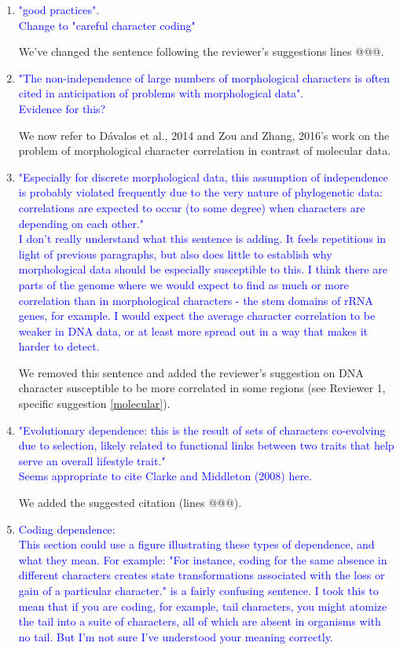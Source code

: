 \documentclass[12pt,letterpaper]{article}
\begin{document}
\begin{enumerate}
\item{\textcolor{blue}{"good practices".\\
Change to "careful character coding"}}

We've changed the sentence following the reviewer's suggestions lines @@@.

\item{\textcolor{blue}{"The non-independence of large numbers of morphological characters is often cited in anticipation of problems with morphological data".\\
Evidence for this?}}

We now refer to  D\'{a}valos et al., 2014 and Zou and Zhang, 2016's work on the problem of morphological character correlation in contrast of molecular data.

\item{\textcolor{blue}{"Especially for discrete morphological data, this assumption of independence is probably violated frequently due to the very nature of phylogenetic data: correlations are expected to occur (to some degree) when characters are depending on each other."\\
I don't really understand what this sentence is adding. It feels repetitious in light of previous paragraphs, but also does little to establish why morphological data should be especially susceptible to this. I think there are parts of the genome where we would expect to find as much or more correlation than in morphological characters - the stem domains of rRNA genes, for example. I would expect the average character correlation to be weaker in DNA data, or at least more spread out in a way that makes it harder to detect.}}

We removed this sentence and added the reviewer's suggestion on DNA character susceptible to be more correlated in some regions (see Reviewer 1, specific suggestion \ref{molecular}).

\item{\textcolor{blue}{"Evolutionary dependence: this is the result of sets of characters co-evolving due to selection, likely related to functional links between two traits that help serve an overall lifestyle trait."\\
Seems appropriate to cite Clarke and Middleton (2008) here.}}

We added the suggested citation (lines @@@).

\item{\textcolor{blue}{Coding dependence:\\
This section could use a figure illustrating these types of dependence, and what they mean. For example: "For instance, coding for the same absence in different characters creates state transformations associated with the loss or gain of a particular character." is a fairly confusing sentence. I took this to mean that if you are coding, for example, tail characters, you might atomize the tail into a suite of characters, all of which are absent in organisms with no tail. But I'm not sure I've understood your meaning correctly.}}


\end{enumerate}
\end{document}
